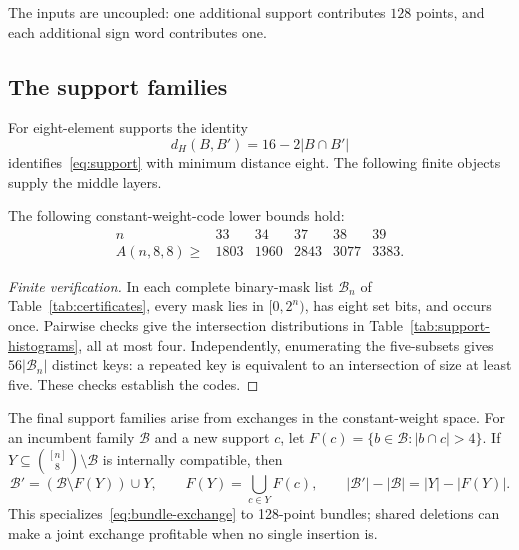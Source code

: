 The inputs are uncoupled: one additional support contributes $128$
points, and each additional sign word contributes one.

\subsection{The support families}
For eight-element supports the identity
\[
 d_H(B,B')=16-2|B\cap B'|
\]
identifies~\eqref{eq:support} with minimum distance eight. The following
finite objects supply the middle layers.

\begin{theorem}\label{thm:supports}
The following constant-weight-code lower bounds hold:
\[
\begin{array}{c|rrrrr}
 n&33&34&37&38&39\\\hline
 A(n,8,8)\ge&1803&1960&2843&3077&3383.
\end{array}
\]
\end{theorem}
\begin{proof}[Finite verification]
In each complete binary-mask list $\mathcal B_n$ of
Table~\ref{tab:certificates}, every mask lies in $[0,2^n)$, has eight
set bits, and occurs once. Pairwise checks give the intersection
distributions in Table~\ref{tab:support-histograms}, all at most four.
Independently, enumerating the five-subsets gives $56|\mathcal B_n|$
distinct keys: a repeated key is equivalent to an intersection of
size at least five. These checks establish the codes.
\end{proof}

\begin{table}[ht]
\centering\small
\caption{Support cardinalities and numbers $h_j$ of unordered pairs
with intersection size $j$. All other intersection counts are zero.}
\label{tab:support-histograms}

\end{table}

The final support families arise from exchanges in the constant-weight
space. For an incumbent family $\mathcal B$ and a new support $c$, let
$F(c)=\{b\in\mathcal B:|b\cap c|>4\}$. If
$Y\subseteq\binom{[n]}8\setminus\mathcal B$ is internally compatible,
then
\begin{equation}\label{eq:exchange}
 \mathcal B'=(\mathcal B\setminus F(Y))\cup Y,
 \qquad F(Y)=\bigcup_{c\in Y}F(c),
 \qquad |\mathcal B'|-|\mathcal B|=|Y|-|F(Y)|.
\end{equation}
This specializes~\eqref{eq:bundle-exchange} to 128-point bundles;
shared deletions can make a joint exchange profitable when no single
insertion is.

